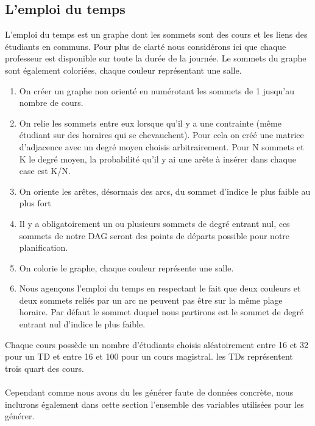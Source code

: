 \documentclass[a4paper,11pt]{article}
\begin{document}
	\subsection{L'emploi du temps}
		L'emploi du temps est un graphe dont les sommets sont des cours et les liens des étudiants en communs.
		Pour plus de clarté nous considérons ici que chaque professeur est disponible sur toute la durée de la journée.
		Le sommets du graphe sont également coloriées, chaque couleur représentant une salle.
		\begin{enumerate}
			\item On créer un graphe non orienté en numérotant les sommets de 1 jusqu'au nombre de cours.
			\item On relie les sommets entre eux lorsque qu'il y a une contrainte (même étudiant sur des horaires qui se chevauchent). Pour cela on créé une matrice d'adjacence avec un degré moyen choisis arbitrairement. Pour N sommets et K le degré moyen, la probabilité qu'il y ai une arête à insérer dans chaque case est K/N.
			\item On oriente les arêtes, désormais des arcs, du  sommet d'indice le plus faible au plus fort
			\item Il y a obligatoirement un ou plusieurs sommets de degré entrant nul, ces sommets de notre DAG seront des points de départs possible pour notre planification.
			\item On colorie le graphe, chaque couleur représente une salle.		
			\item Nous agençons l'emploi du temps en respectant le fait que deux couleurs et deux sommets reliés par un arc ne peuvent pas être sur la même plage horaire. Par défaut le sommet duquel nous partirons est le sommet de degré entrant nul d'indice le plus faible.
		\end{enumerate}
		Chaque cours possède un nombre d'étudiants choisis aléatoirement entre 16 et 32 pour un TD et entre 16 et 100 pour un cours magistral. les TDs représentent trois quart des cours.\\
		\\	
		Cependant comme nous avons du les générer faute de données concrète, nous inclurons également dans cette section l'ensemble des variables utilisées pour les générer.
\end{document}

